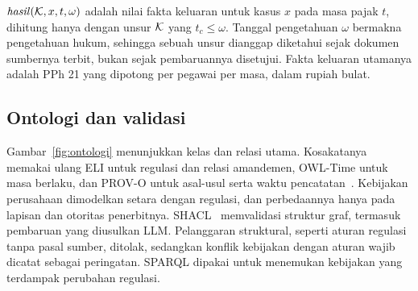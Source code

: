 \begin{definisi}
\label{def:hasil}
$\mathit{hasil}(\mathcal{K}, x, t, \omega)$ adalah nilai fakta keluaran untuk kasus $x$ pada masa pajak $t$, dihitung hanya dengan unsur $\mathcal{K}$ yang $t_c \le \omega$. Tanggal pengetahuan $\omega$ bermakna pengetahuan hukum, sehingga sebuah unsur dianggap diketahui sejak dokumen sumbernya terbit, bukan sejak pembaruannya disetujui. Fakta keluaran utamanya adalah PPh 21 yang dipotong per pegawai per masa, dalam rupiah bulat.
\end{definisi}

\subsection{Ontologi dan validasi}
Gambar~\ref{fig:ontologi} menunjukkan kelas dan relasi utama. Kosakatanya memakai ulang ELI untuk regulasi dan relasi amandemen, OWL-Time untuk masa berlaku, dan PROV-O untuk asal-usul serta waktu pencatatan~\cite{publicationsoffice2026eli,cox2017owltime,lebo2013provo}. Kebijakan perusahaan dimodelkan setara dengan regulasi, dan perbedaannya hanya pada lapisan dan otoritas penerbitnya.  SHACL~\cite{knublauch2017shacl} memvalidasi struktur graf, termasuk pembaruan yang diusulkan LLM. Pelanggaran struktural, seperti aturan regulasi tanpa pasal sumber, ditolak, sedangkan konflik kebijakan dengan aturan wajib dicatat sebagai peringatan.  SPARQL dipakai untuk menemukan kebijakan yang terdampak perubahan regulasi.

